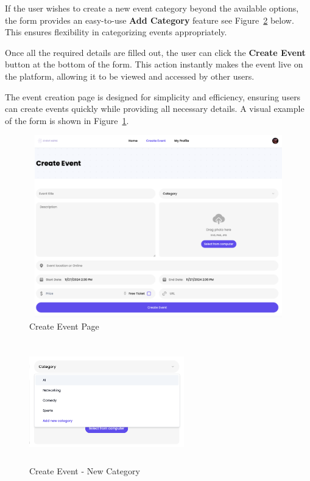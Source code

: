 If the user wishes to create a new event category beyond the available options, the form provides an easy-to-use \textbf{Add Category} feature see Figure~\ref{fig:createEvent2} below. This ensures flexibility in categorizing events appropriately.

Once all the required details are filled out, the user can click the \textbf{Create Event} button at the bottom of the form. This action instantly makes the event live on the platform, allowing it to be viewed and accessed by other users.

The event creation page is designed for simplicity and efficiency, ensuring users can create events quickly while providing all necessary details. A visual example of the form is shown in Figure~\ref{fig:createEvent1}.

\begin{figure}[H]
	\centering	\includegraphics[width=1.0\textwidth,height=300px,frame]{images/createEvent1.png}
	\caption{Create Event Page}
        \label{fig:createEvent1}
\end{figure}


\begin{figure}[H]
	\centering	\includegraphics[width=0.6\textwidth,height=200px,frame]{images/createEvent2.png}
	\caption{Create Event - New Category}
        \label{fig:createEvent2}
\end{figure}


